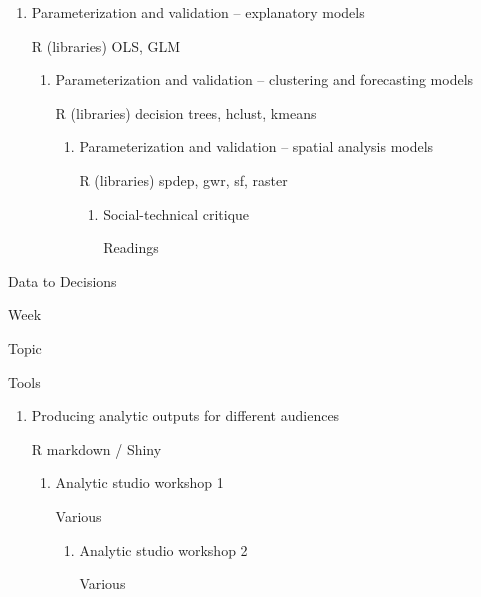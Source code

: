 \documentclass[
]{book}
\begin{document}
\begin{enumerate}
\def\labelenumi{\arabic{enumi}.}
\setcounter{enumi}{5}
\item
  Parameterization and validation -- explanatory models

  R (libraries) OLS, GLM

  \begin{enumerate}
  \def\labelenumii{\arabic{enumii}.}
  \setcounter{enumii}{6}
  \item
    Parameterization and validation -- clustering and forecasting models

    R (libraries) decision trees, hclust, kmeans

    \begin{enumerate}
    \def\labelenumiii{\arabic{enumiii}.}
    \setcounter{enumiii}{7}
    \item
      Parameterization and validation -- spatial analysis models

      R (libraries) spdep, gwr, sf, raster

      \begin{enumerate}
      \def\labelenumiv{\arabic{enumiv}.}
      \setcounter{enumiv}{8}
      \item
        Social-technical critique

        Readings
      \end{enumerate}
    \end{enumerate}
  \end{enumerate}
\end{enumerate}

Data to Decisions

Week

Topic

Tools

\begin{enumerate}
\def\labelenumi{\arabic{enumi}.}
\setcounter{enumi}{9}
\item
  Producing analytic outputs for different audiences

  R markdown / Shiny

  \begin{enumerate}
  \def\labelenumii{\arabic{enumii}.}
  \setcounter{enumii}{10}
  \item
    Analytic studio workshop 1

    Various

    \begin{enumerate}
    \def\labelenumiii{\arabic{enumiii}.}
    \setcounter{enumiii}{11}
    \item
      Analytic studio workshop 2

      Various
    \end{enumerate}
  \end{enumerate}
\end{enumerate}
\end{document}
